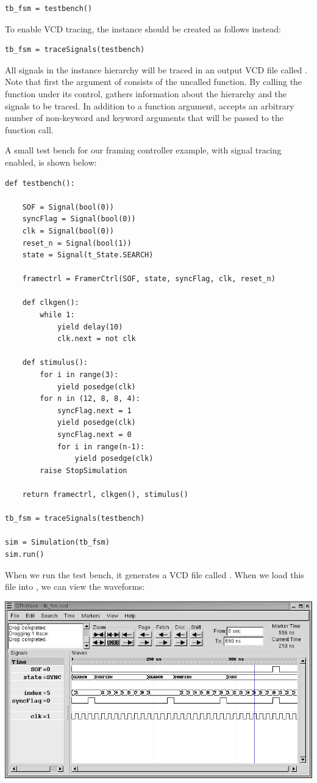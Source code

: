 \begin{verbatim}
tb_fsm = testbench()
\end{verbatim}

To enable VCD tracing, the instance should be created as follows
instead:

\begin{verbatim}
tb_fsm = traceSignals(testbench)
\end{verbatim}

All signals in the instance hierarchy will be traced in an output VCD
file called . Note that first the argument of
 consists of the uncalled function. By
calling the function under its control, 
gathers information about the hierarchy and the signals to be traced.
In addition to a function argument,  accepts
an arbitrary number of non-keyword and keyword arguments that will be
passed to the function call. 

A small test bench for our framing controller example,
with signal tracing enabled, is shown below:


\begin{verbatim}
def testbench():

    SOF = Signal(bool(0))
    syncFlag = Signal(bool(0))
    clk = Signal(bool(0))
    reset_n = Signal(bool(1))
    state = Signal(t_State.SEARCH)
            
    framectrl = FramerCtrl(SOF, state, syncFlag, clk, reset_n)

    def clkgen():
        while 1:
            yield delay(10)
            clk.next = not clk

    def stimulus():
        for i in range(3):
            yield posedge(clk)
        for n in (12, 8, 8, 4):
            syncFlag.next = 1
            yield posedge(clk)
            syncFlag.next = 0
            for i in range(n-1):
                yield posedge(clk)
        raise StopSimulation
        
    return framectrl, clkgen(), stimulus()

tb_fsm = traceSignals(testbench)

sim = Simulation(tb_fsm)
sim.run()
\end{verbatim}

When we run the test bench, it generates a VCD file
called . When we load this file into
, we can view the waveforms:

\ifpdf
\includegraphics{tbfsm.png}
\fi

